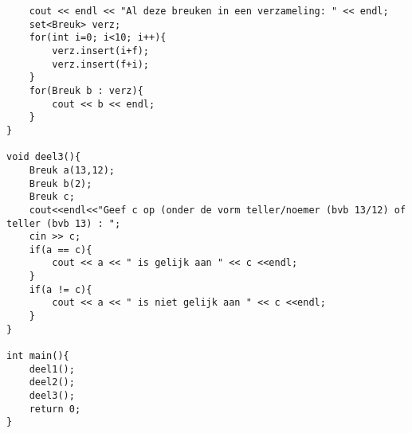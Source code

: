 \begin{footnotesize}
\begin{verbatim}
    cout << endl << "Al deze breuken in een verzameling: " << endl;
    set<Breuk> verz;
    for(int i=0; i<10; i++){
        verz.insert(i+f);
        verz.insert(f+i);
    }
    for(Breuk b : verz){
        cout << b << endl;
    }
}

void deel3(){
    Breuk a(13,12);
    Breuk b(2);
    Breuk c;
    cout<<endl<<"Geef c op (onder de vorm teller/noemer (bvb 13/12) of teller (bvb 13) : ";
    cin >> c;
    if(a == c){
        cout << a << " is gelijk aan " << c <<endl;
    }
    if(a != c){
        cout << a << " is niet gelijk aan " << c <<endl;
    }        
}

int main(){    
    deel1();
    deel2();
    deel3();
    return 0;
}
\end{verbatim}
\end{footnotesize}
\endoef

